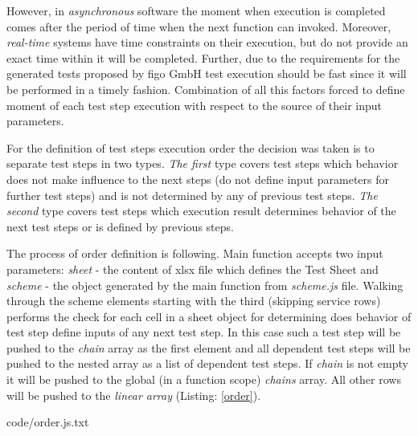 However, in \textit{asynchronous} software the moment when execution is completed comes after the period of time when the next function can invoked. Moreover, \textit{real-time} systems have time constraints on their execution, but do not provide an exact time within it will be completed. Further, due to the requirements for the generated tests proposed by figo GmbH test execution should be fast since it will be performed in a timely fashion. Combination of all this factors forced to define moment of each test step execution with respect to the source of their input parameters.


For the definition of test steps execution order the decision was taken is to separate test steps in two types. \textit{The first} type covers test steps which behavior does not make influence to the next steps (do not define input parameters for further test steps) and is not determined by any of previous test steps. \textit{The second} type covers test steps which execution result determines behavior of the next test steps or is defined by previous steps.

%
The process of order definition is following. Main function accepts two input parameters: \textit{sheet} - the content of xlsx file which defines the Test Sheet and \textit{scheme} - the object generated by the main function from \textit{scheme.js} file. Walking through the scheme elements starting with the third (skipping service rows) performs the check for each cell in a sheet object for determining does behavior of test step define inputs of any next test step. In this case such a test step will be pushed to the \textit{chain} array as the first element and all dependent test steps will be pushed to the nested array as a list of dependent test steps. If \textit{chain} is not empty it will be pushed to the global (in a function scope) \textit{chains}  array. All other rows will be pushed to the \textit{linear array} (Listing: \ref{order}).



{code/order.js.txt}

